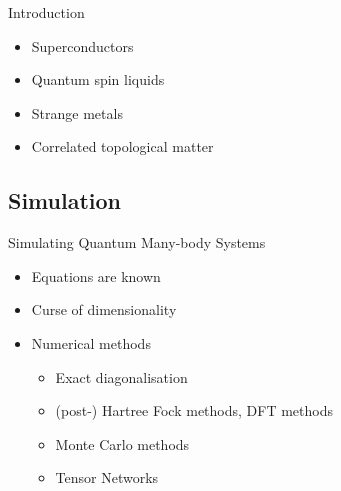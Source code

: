 \begin{frame}{Introduction}
\begin{itemize}
{\begin{itemize}
                      \item Superconductors
                      \item Quantum  spin  liquids
                      \item Strange metals
                      \item Correlated topological matter
                  \end{itemize}
              }
    \end{itemize}
\end{frame}

\subsection{Simulation}

\begin{frame}{Simulating Quantum Many-body Systems}
    \begin{itemize}
        \item Equations are known
        \item Curse of dimensionality
        \item Numerical methods
              \begin{itemize}
                  \item Exact diagonalisation
                  \item (post-) Hartree Fock methods, DFT methods
                  \item Monte Carlo methods
                  \item Tensor Networks
              \end{itemize}
    \end{itemize}
\end{frame}

